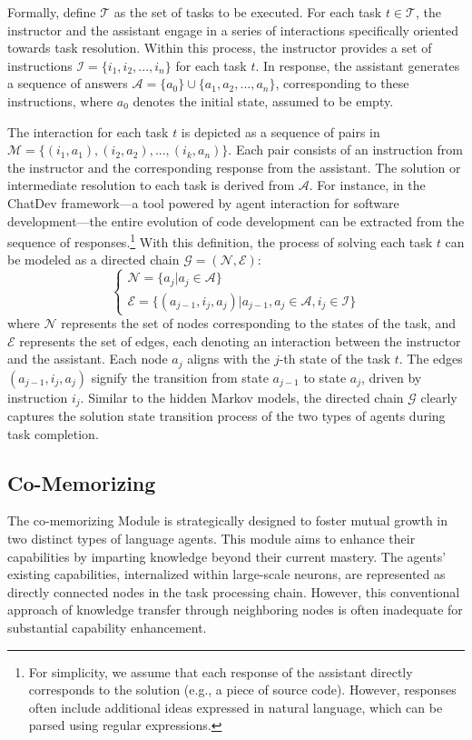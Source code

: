\documentclass[11pt]{article}
\begin{document}
Formally, define \( \mathcal{T} \) as the set of tasks to be executed. For each task \( t \in \mathcal{T} \), the instructor and the assistant engage in a series of interactions specifically oriented towards task resolution. Within this process, the instructor provides a set of instructions \( \mathcal{I} = \{i_1, i_2, ..., i_n\} \) for each task \( t \). In response, the assistant generates a sequence of answers \( \mathcal{A} = \{a_0\} \cup \{a_1, a_2, ..., a_n\} \), corresponding to these instructions, where \( a_0 \) denotes the initial state, assumed to be empty.

The interaction for each task \( t \) is depicted as a sequence of pairs in \( \mathcal{M} = \{(i_1, a_1), (i_2, a_2), ..., (i_k, a_n)\} \). Each pair consists of an instruction from the instructor and the corresponding response from the assistant. The solution or intermediate resolution to each task is derived from \( \mathcal{A} \). For instance, in the ChatDev framework—a tool powered by agent interaction for software development—the entire evolution of code development can be extracted from the sequence of responses.\footnote{For simplicity, we assume that each response of the assistant directly corresponds to the solution (e.g., a piece of source code). However, responses often include additional ideas expressed in natural language, which can be parsed using regular expressions.}
With this definition, the process of solving each task \( t \) can be modeled as a directed chain \( \mathcal{G} = (\mathcal{N}, \mathcal{E}) \):
\[
\left\{
\begin{array}{ll}
\mathcal{N} = \{ a_j | a_j \in \mathcal{A} \} \\
\mathcal{E} = \{ (a_{j-1}, i_j, a_j) | a_{j-1}, a_j \in \mathcal{A}, i_j \in \mathcal{I} \}
\end{array}
\right.
\]
where \( \mathcal{N} \) represents the set of nodes corresponding to the states of the task, and \( \mathcal{E} \) represents the set of edges, each denoting an interaction between the instructor and the assistant. Each node \( a_j \) aligns with the \( j \)-th state of the task \( t \). The edges \( (a_{j-1}, i_j, a_j) \) signify the transition from state \( a_{j-1} \) to state \( a_j \), driven by instruction \( i_j \).
Similar to the hidden Markov models, the directed chain \( \mathcal{G} \) clearly captures the solution state transition process of the two types of agents during task completion.


\subsection{Co-Memorizing}
The co-memorizing Module is strategically designed to foster mutual growth in two distinct types of language agents. This module aims to enhance their capabilities by imparting knowledge beyond their current mastery. The agents’ existing capabilities, internalized within large-scale neurons, are represented as directly connected nodes in the task processing chain. However, this conventional approach of knowledge transfer through neighboring nodes is often inadequate for substantial capability enhancement.
\end{document}
